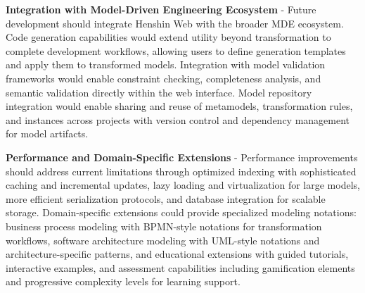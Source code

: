   \textbf{Integration with Model-Driven Engineering Ecosystem} - Future development should integrate Henshin Web with the broader MDE ecosystem. Code generation capabilities would extend utility beyond transformation to complete development workflows, allowing users to define generation templates and apply them to transformed models. Integration with model validation frameworks would enable constraint checking, completeness analysis, and semantic validation directly within the web interface. Model repository integration would enable sharing and reuse of metamodels, transformation rules, and instances across projects with version control and dependency management for model artifacts.
  
  \textbf{Performance and Domain-Specific Extensions} - Performance improvements should address current limitations through optimized indexing with sophisticated caching and incremental updates, lazy loading and virtualization for large models, more efficient serialization protocols, and database integration for scalable storage. Domain-specific extensions could provide specialized modeling notations: business process modeling with BPMN-style notations for transformation workflows, software architecture modeling with UML-style notations and architecture-specific patterns, and educational extensions with guided tutorials, interactive examples, and assessment capabilities including gamification elements and progressive complexity levels for learning support.
